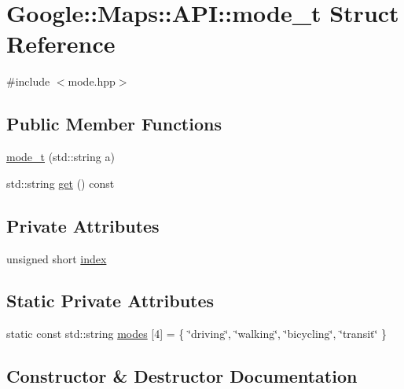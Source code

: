 \hypertarget{a00044}{}\section{Google\+:\+:Maps\+:\+:A\+PI\+:\+:mode\+\_\+t Struct Reference}
\label{a00044}


{\ttfamily \#include $<$mode.\+hpp$>$}

\subsection*{Public Member Functions}
\begin{DoxyCompactItemize}
\item 
\hyperlink{a00044_a9cbdbd6096f389a15acdbefa19490235}{mode\+\_\+t} (std\+::string a)
\item 
std\+::string \hyperlink{a00044_a84b8a1aa0c105d5d6a530777dcd9d4b4}{get} () const
\end{DoxyCompactItemize}
\subsection*{Private Attributes}
\begin{DoxyCompactItemize}
\item 
unsigned short \hyperlink{a00044_ac117d89859504fe68fec3a706b43e4bd}{index}
\end{DoxyCompactItemize}
\subsection*{Static Private Attributes}
\begin{DoxyCompactItemize}
\item 
static const std\+::string \hyperlink{a00044_a752861e4de1fd7afb443595988a86a01}{modes} \mbox{[}4\mbox{]} = \{ \char`\"{}driving\char`\"{}, \char`\"{}walking\char`\"{}, \char`\"{}bicycling\char`\"{}, \char`\"{}transit\char`\"{} \}
\end{DoxyCompactItemize}


\subsection{Constructor \& Destructor Documentation}
\mbox{\label{a00044_a9cbdbd6096f389a15acdbefa19490235}} 
